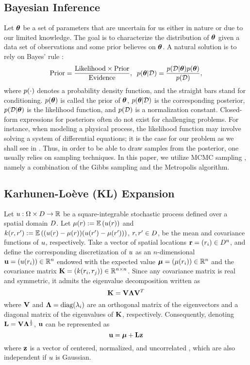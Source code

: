 \subsection{Bayesian Inference} 
Let ${\boldsymbol\theta}$ be a set of parameters that are uncertain for us either in nature or due to our limited knowledge. The goal is to characterize the distribution of ${\boldsymbol\theta}$ given a data set of observations and some prior believes on ${\boldsymbol\theta}$. A natural solution is to rely on Bayes' rule \cite{gelman2004}:
\begin{equation} \elabel{bayes}
  \text{Prior} = \frac{\text{Likelihood} \times \text{Prior}}{\text{Evidence}}, \;\; \f{\vparam | \Data} = \frac{\f{\Data | \vparam} \f{\vparam}}{\f{\Data}},
\end{equation}
where $\f{\cdot}$ denotes a probability density function, and the straight bars stand for conditioning. $\f{\vparam}$ is called the prior of ${\boldsymbol\theta}$, $\f{\vparam | \Data}$ is the corresponding posterior, $\f{\Data | \vparam}$ is the likelihood function, and $\f{\Data}$ is a normalization constant. Closed-form expressions for posteriors often do not exist for challenging problems. For instance, when modeling a physical process, the likelihood function may involve solving a system of differential equations; it is the case for our problem as we shall see in . Thus, in order to be able to draw samples from the posterior, one usually relies on sampling techniques. In this paper, we utilize MCMC sampling \cite{gelman2004}, namely a combination of the Gibbs sampling and the Metropolis algorithm.

\subsection{Karhunen-Lo\`{e}ve (KL) Expansion} 
Let $u: \Omega \times D \to \mathbb{R}$ be a square-integrable stochastic process defined over a spatial domain $D$. Let $\fMean{\r} := \E{\u(\r)}$ and $\fCov{\r, \r'} := \E{(\u(\r) - \fMean{\r}) (\u(\r') - \fMean{\r'})}$, $r, r' \in D$, be the mean and covariance functions of $u$, respectively. Take a vector of spatial locations $\mathbf{r} = (r_i) \in D^n$, and define the corresponding discretization of $u$ as an $n$-dimensional \rv\ $\mathbf{u} = (u(r_i)) \in \mathbb{R}^n$ endowed with the expected value $\vmean = (\fMean{\r_i}) \in \real^n$ and the covariance matrix $\mCov = (\fCov{\r_i, \r_j}) \in \real^{n \times n}$. Since any covariance matrix is real and symmetric, it admits the eigenvalue decomposition \cite{press2007} written as
\[
  \mathbf{K} = \mathbf{V} \mathbf{\Lambda} \mathbf{V}^T
\]
where $\mathbf{V}$ and $\mathbf{\Lambda} = \text{diag}(\lambda_i)$ are an orthogonal matrix of the eigenvectors and a diagonal matrix of the eigenvalues of $\mathbf{K}$, respectively. Consequently, denoting $\mathbf{L} = \mathbf{V} \mathbf{\Lambda}^\frac{1}{2}$, $\mathbf{u}$ can be represented as
\begin{equation} \elabel{kl-expansion}
  \vu = \vmean + \mKL \vz
\end{equation}
where $\mathbf{z}$ is a vector of centered, normalized, and uncorrelated \rvs, which are also independent if $u$ is Gaussian.

